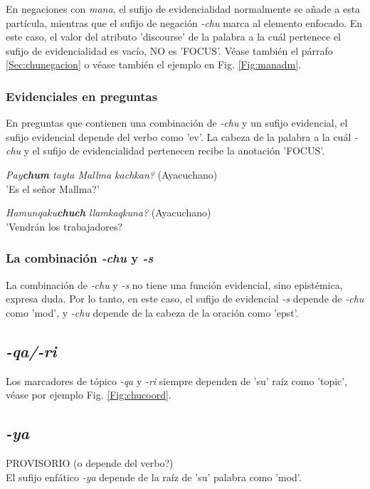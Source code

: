 \documentclass[a4paper,11pt,DIV12]{scrartcl}
\begin{document}
En negaciones con {\em mana}, el sufijo de evidencialidad normalmente se a\~nade a esta part\'icula, mientras que el sufijo de negaci\'on {\em -chu} marca al elemento enfocado. En este caso, el valor del atributo 'discourse' de la palabra a la cu\'al pertenece el sufijo de evidencialidad es vac\'io, NO es 'FOCUS'. V\'ease tambi\'en el p\'arrafo \ref{Sec:chunegacion} o v\'ease tambi\'en el ejemplo en Fig. \ref{Fig:manadm}.

\subsubsection{Evidenciales en preguntas}
En preguntas que contienen una combinaci\'on de {\em -chu} y un sufijo evidencial, el sufijo evidencial depende del verbo como 'ev'. La cabeza de la palabra a la cu\'al {\em -chu} y el sufijo de evidencialidad pertenecen recibe la anotaci\'on 'FOCUS'.

\begin{examples}
 \item {\em Pay\textbf{chum} tayta Mallma kachkan?} (Ayacuchano)\\
      '{\textquestiondown}Es el se\~nor Mallma?'
 \item {\em Hamunqaku\textbf{chuch} llamkaqkuna?} (Ayacuchano)\\
      '{\textquestiondown}Vendr\'an los trabajadores?\\
    		\hfill{\small \citep[120]{Soto76a}}
\end{examples}

\subsubsection{La combinaci\'on {\em -chu} y {\em -s}}\label{Sec:chus}
La combinaci\'on de {\em -chu} y {\em -s} no tiene una funci\'on evidencial, sino epist\'emica, expresa duda. Por lo tanto, en este caso, el sufijo de evidencial {\em -s} depende de {\em -chu} como 'mod', y {\em -chu} depende de la cabeza de la oraci\'on como 'epst'.

   \subsection{{\em-qa/-ri}}
Los marcadores de t\'opico {\em -qa} y {\em -ri} siempre dependen de 'su' ra\'iz como 'topic', v\'ease por ejemplo Fig. \ref{Fig:chucoord}.

  \subsection{{\em -ya}}
PROVISORIO (o depende del verbo?)\\
El sufijo enf\'atico {\em -ya} depende de la ra\'iz de 'su' palabra como 'mod'.
\end{document}
